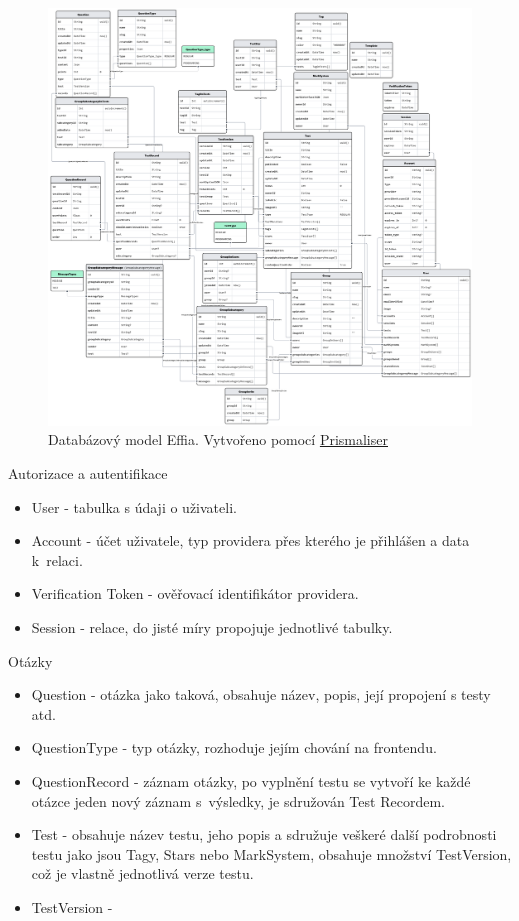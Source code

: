 \documentclass[12pt, a4paper,
openright
]{report}
\begin{document}
\begin{figure}[H]
	\centering %
	\includegraphics[width=1\linewidth]{image/schema.png} 
	\caption{Databázový model Effia. Vytvořeno pomocí \href{https://github.com/Ovyerus/prismaliser}{Prismaliser}} %
	\label{fig:schema} %
\end{figure}

Autorizace a autentifikace
\begin{itemize}
	\item User - tabulka s údaji o uživateli.
	\item Account - účet uživatele, typ providera přes kterého je přihlášen a data k~relaci.
	\item Verification Token - ověřovací identifikátor providera.
	\item Session - relace, do jisté míry propojuje jednotlivé tabulky.
\end{itemize} 
Otázky
\begin{itemize}
	\item Question - otázka jako taková, obsahuje název, popis, její propojení s testy atd.
	\item QuestionType - typ otázky, rozhoduje jejím chování na frontendu.
	\item QuestionRecord - záznam otázky, po vyplnění testu se vytvoří ke každé otázce jeden nový záznam s~výsledky, je sdružován Test Recordem.
\end{itemize}
\begin{itemize}
	\item Test - obsahuje název testu, jeho popis a sdružuje veškeré další podrobnosti testu jako jsou Tagy, Stars nebo MarkSystem, obsahuje množství TestVersion, což je vlastně jednotlivá verze testu.
	\item TestVersion - 
\end{itemize}
\end{document}
